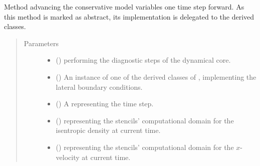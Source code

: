 \documentclass[letterpaper,10pt,english]{sphinxmanual}
\begin{document}
\begin{fulllineitems}
\begin{fulllineitems}
\label{\detokenize{api:dycore.prognostic_isentropic.PrognosticIsentropic.step_forward}}
Method advancing the conservative model variables one time step forward.
As this method is marked as abstract, its implementation is delegated to the derived classes.
\begin{quote}\begin{description}
\item[{Parameters}] \leavevmode\begin{itemize}
\item {} 
 () \textendash{} {\hyperref[\detokenize{api:dycore.diagnostic_isentropic.DiagnosticIsentropic}]{}} performing the diagnostic steps
of the dynamical core.

\item {} 
 () \textendash{} An instance of one of the derived classes of {\hyperref[\detokenize{api:dycore.horizontal_boundary.HorizontalBoundary}]{}},
implementing the lateral boundary conditions.

\item {} 
 () \textendash{} A  representing the time step.

\item {} 
 () \textendash{}  representing the stencils’ computational domain for the isentropic density
at current time.

\item {} 
 () \textendash{}  representing the stencils’ computational domain for the \(x\)-velocity
at current time.


\end{itemize}
\end{description}
\end{quote}
\end{fulllineitems}
\end{fulllineitems}
\end{document}
